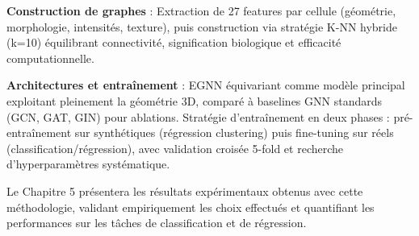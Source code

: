 \textbf{Construction de graphes} : Extraction de 27 features par cellule (géométrie, morphologie, intensités, texture), puis construction via stratégie K-NN hybride (k=10) équilibrant connectivité, signification biologique et efficacité computationnelle.

\textbf{Architectures et entraînement} : EGNN équivariant comme modèle principal exploitant pleinement la géométrie 3D, comparé à baselines GNN standards (GCN, GAT, GIN) pour ablations. Stratégie d'entraînement en deux phases : pré-entraînement sur synthétiques (régression clustering) puis fine-tuning sur réels (classification/régression), avec validation croisée 5-fold et recherche d'hyperparamètres systématique.

Le Chapitre 5 présentera les résultats expérimentaux obtenus avec cette méthodologie, validant empiriquement les choix effectués et quantifiant les performances sur les tâches de classification et de régression.
